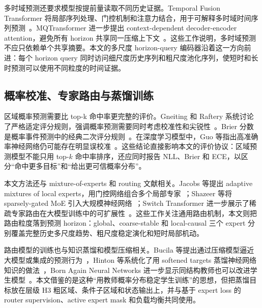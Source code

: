 多时域预测还要求模型按提前量读取不同历史证据。Temporal Fusion Transformer 将局部序列处理、门控机制和注意力结合，用于可解释多时域时间序列预测~\cite{lim2021tft}。MQTransformer 进一步提出 context-dependent decoder-encoder attention，避免所有 horizon 共享同一压缩上下文~\cite{mqtransformer2020}。这些工作说明，多时域预测不应只依赖单个共享摘要。本文的多尺度 horizon-query 编码器沿着这一方向前进：每个 horizon query 同时访问细尺度历史序列和粗尺度池化序列，使短时和长时预测可以使用不同粒度的时间证据。

\subsection{概率校准、专家路由与蒸馏训练}

区域概率预测需要比 top-k 命中率更完整的评价。Gneiting 和 Raftery 系统讨论了严格适定评分规则，强调概率预测需要同时考虑校准性和尖锐性~\cite{gneiting2007strictlyproper}。Brier 分数是概率事件预测中的经典二次评分规则~\cite{brier1950verification}。在深度学习模型中，Guo 等指出高准确率神经网络仍可能存在明显误校准~\cite{guo2017calibration}。这些结论直接影响本文的评价协议：区域预测模型不能只用 top-$k$ 命中率排序，还应同时报告 NLL、Brier 和 ECE，以区分“命中更多目标”和“给出更可信概率分布”。

本文方法还与 mixture-of-experts 和 routing 文献相关。Jacobs 等提出 adaptive mixtures of local experts，用门控网络组合多个局部专家~\cite{Jacobs_1991}；Shazeer 等将 sparsely-gated MoE 引入大规模神经网络~\cite{shazeer2017outrageouslylargeneuralnetworks}；Switch Transformer 进一步展示了稀疏专家路由在大模型训练中的可扩展性~\cite{JMLR:v23:21-0998}。这些工作关注通用路由机制，本文则把路由粒度落到预测 horizon：global、coarse-stable 和 local-causal 三个 expert 分别覆盖完整历史多尺度趋势、粗尺度稳定演化和短时局部机动。

路由模型的训练也与知识蒸馏和模型压缩相关。Bucila 等提出通过压缩模型逼近大模型或集成的预测行为~\cite{bucila2006model_compression}，Hinton 等系统化了用 softened targets 蒸馏神经网络知识的做法~\cite{hinton2015distilling}，Born Again Neural Networks 进一步显示同结构教师也可以改进学生模型~\cite{furlanello2018born_again}。本文借鉴的是这种“用教师概率分布稳定学生训练”的思想，但把蒸馏目标放在层级 H3 粗区域、条件子区域和状态输出上，并与基于 expert loss 的 router supervision、active expert mask 和负载均衡共同使用。
